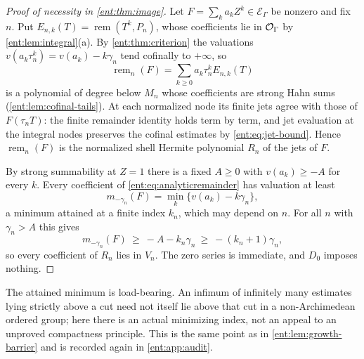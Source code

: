 \documentclass[11pt]{article}
\theoremstyle{plain}
\theoremstyle{plain}
\theoremstyle{plain}
\theoremstyle{definition}
\theoremstyle{definition}
\theoremstyle{definition}
\theoremstyle{definition}
\theoremstyle{remark}
\newcommand{\E}{\mathcal E_\Gamma}
\DeclareMathOperator{\remp}{rem}\DeclareMathOperator{\Res}{Res}
\begin{document}
\begin{proof}[Proof of necessity in \cref{ent:thm:image}]
Let $F=\sum_ka_kZ^k\in\E$ be nonzero and fix $n$. Put
$E_{n,k}(T)=\remp(T^k,P_n)$, whose coefficients lie in $\mathcal O_\Gamma$ by
\cref{ent:lem:integral}(a). By \cref{ent:thm:criterion} the valuations
$v(a_k\tau_n^k)=v(a_k)-k\gamma_n$ tend cofinally to $+\infty$, so
\begin{equation}\label{ent:eq:analyticremainder}
 \remp_n(F)=\sum_{k\ge0}a_k\tau_n^kE_{n,k}(T)
\end{equation}
is a polynomial of degree below $M_n$ whose coefficients are strong Hahn sums
(\cref{ent:lem:cofinal-tails}). At each normalized node its finite jets agree
with those of $F(\tau_nT)$: the finite remainder identity holds term by term,
and jet evaluation at the integral nodes preserves the cofinal estimates by
\eqref{ent:eq:jet-bound}. Hence $\remp_n(F)$ is the normalized shell Hermite
polynomial $R_n$ of the jets of $F$.

By strong summability at $Z=1$ there is a fixed $A\ge0$ with $v(a_k)\ge-A$
for every $k$. Every coefficient of \eqref{ent:eq:analyticremainder} has
valuation at least
\[
 m_{-\gamma_n}(F)=\min_k\{v(a_k)-k\gamma_n\},
\]
a minimum attained at a finite index $k_n$, which may depend on $n$. For all
$n$ with $\gamma_n>A$ this gives
\[
 m_{-\gamma_n}(F)\ \ge\ -A-k_n\gamma_n\ \ge\ -(k_n+1)\gamma_n ,
\]
so every coefficient of $R_n$ lies in $V_n$. The zero series is immediate,
and $D_0$ imposes nothing.
\end{proof}

The attained minimum is load-bearing. An infimum of infinitely many estimates
lying strictly above a cut need not itself lie above that cut in a
non-Archimedean ordered group; here there is an actual minimizing index, not
an appeal to an unproved compactness principle. This is the same point as in
\cref{ent:lem:growth-barrier} and is recorded again in
\cref{ent:app:audit}.
\end{document}
